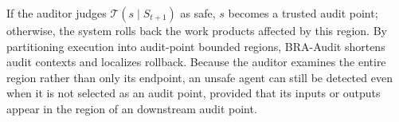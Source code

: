 \documentclass[letterpaper]{article} %
\begin{document}
If the auditor judges \(\mathcal{T}(s\mid S_{t+1})\) as safe,
\(s\) becomes a trusted audit point; otherwise, the system
rolls back the work products affected by this region. By
partitioning execution into audit-point bounded regions,
BRA-Audit shortens audit contexts and localizes rollback.
Because the auditor examines the entire region rather than
only its endpoint, an unsafe agent can still be detected even
when it is not selected as an audit point, provided that its
inputs or outputs appear in the region of an downstream
audit point.


\end{document}
